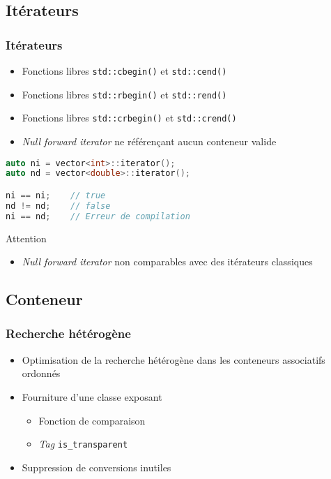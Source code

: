 \documentclass[C++.tex]{subfiles}
\begin{document}
\subsection*{Itérateurs}
\begin{frame}[fragile]
	\frametitle{Itérateurs}
	\begin{itemize}
		\item Fonctions libres \lstinline|std::cbegin()| et \lstinline|std::cend()|
		\item Fonctions libres \lstinline|std::rbegin()| et \lstinline|std::rend()|
		\item Fonctions libres \lstinline|std::crbegin()| et \lstinline|std::crend()|
		\item \textit{Null forward iterator} ne référençant aucun conteneur valide
	\end{itemize}

	\begin{lstlisting}[language=C++]
auto ni = vector<int>::iterator();
auto nd = vector<double>::iterator();

ni == ni;    // true
nd != nd;    // false
ni == nd;    // Erreur de compilation\end{lstlisting}

	\begin{alertblock}{Attention}
		\begin{itemize}
			\item \textit{Null forward iterator} non comparables avec des itérateurs \og classiques\fg{}
		\end{itemize}
	\end{alertblock}
\end{frame}

\subsection*{Conteneur}
\begin{frame}[fragile]
	\frametitle{Recherche hétérogène}
	\begin{itemize}
		\item Optimisation de la recherche hétérogène dans les conteneurs associatifs ordonnés
		\item Fourniture d'une classe exposant
		\begin{itemize}
			\item Fonction de comparaison
			\item \textit{Tag} \lstinline|is_transparent|
		\end{itemize}
		\item Suppression de conversions inutiles
	\end{itemize}
\end{frame}
\end{document}

